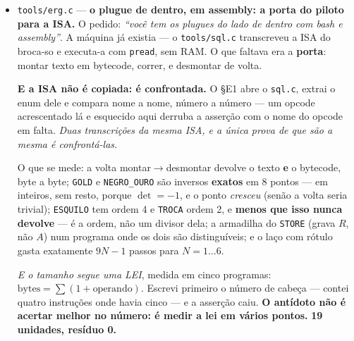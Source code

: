 \documentclass[11pt]{article}
\newcommand{\code}[1]{\texttt{\small #1}}
\theoremstyle{plain}
\theoremstyle{remark}
\begin{document}
\begin{itemize}
\textbf{Um lado entrega o outro} (§F6): o piloto fornece o aditivo (Fourier) \emph{ou} o
multiplicativo (Mellin) --- as potências $\sigma^k$ --- e os dois caminhos dão a \textbf{mesma}
régua nos seis corpos. \emph{A simetria fica guardada no cruzado:} $x \wedge \nu(x) \neq 0$ sobrevive
ao dual.

\textbf{E a cobertura fecha} (§F7): as órbitas de $\times\sigma$ em $\mathbb{Z}_q^2$ \textbf{partem}
o plano --- $\sum|\text{órbita}| = q^2$ sem sobreposição, em $q = 3,4,5,7,11,12$ --- e a
\textbf{maior órbita é exatamente $\pi(q)$}, o período de Pisano. Com $N(\sigma)$ e $q$ não primos
entre si a cobertura \textbf{falha} (5 de 16 pontos), logo o teste distingue em vez de afirmar
sempre. \textbf{18 unidades, resíduo 0.}

\item \code{tools/erg.c} --- \textbf{o plugue de dentro, em assembly: a porta do piloto para a
ISA.} O pedido: \emph{``você tem os plugues do lado de dentro com bash e assembly''}. A máquina já
existia --- o \code{tools/sql.c} transcreveu a ISA do broca-so e executa-a com \code{pread}, sem
RAM. O que faltava era a \textbf{porta}: montar texto em bytecode, correr, e desmontar de volta.

\textbf{E a ISA não é copiada: é confrontada.} O §E1 abre o \code{sql.c}, extrai o enum dele e
compara nome a nome, número a número --- um opcode acrescentado lá e esquecido aqui derruba a
asserção com o nome do opcode em falta. \emph{Duas transcrições da mesma ISA, e a única prova de
que são a mesma é confrontá-las.}

O que se mede: a volta montar$\to$desmontar devolve o texto \textbf{e} o bytecode, byte a byte;
\code{GOLD} e \code{NEGRO\_OURO} são inversos \textbf{exatos} em 8 pontos --- em inteiros, sem
resto, porque $\det = -1$, e o ponto \emph{cresceu} (senão a volta seria trivial); \code{ESQUILO}
tem ordem 4 e \code{TROCA} ordem 2, e \textbf{menos que isso nunca devolve} --- é a ordem, não um
divisor dela; a armadilha do \code{STORE} (grava $R$, não $A$) num programa onde os dois são
distinguíveis; e o laço com rótulo gasta exatamente $9N-1$ passos para $N=1\ldots6$.

\emph{E o tamanho segue uma LEI}, medida em cinco programas: $\text{bytes} = \sum (1 +
\text{operando})$. Escrevi primeiro o número de cabeça --- contei quatro instruções onde havia
cinco --- e a asserção caiu. \textbf{O antídoto não é acertar melhor no número: é medir a lei em
vários pontos.} \textbf{19 unidades, resíduo 0.}


\end{itemize}
\end{document}
